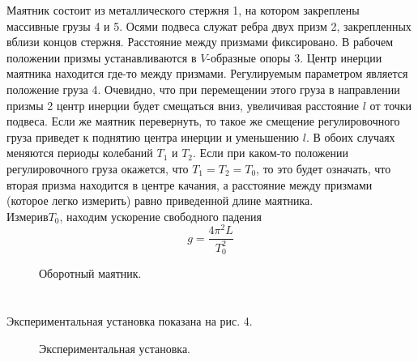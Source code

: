 \documentclass[a4paper]{article}
\begin{document}
Маятник состоит из металлического стержня 1, на котором
закреплены массивные грузы 4 и 5. Осями подвеса служат ребра двух призм 2, закрепленных вблизи концов стержня. Расстояние между призмами фиксировано. В рабочем положении призмы
устанавливаются в $V$-образные опоры 3. Центр инерции маятника находится где-то между призмами.
Регулируемым параметром является положение груза 4. Очевидно, что при перемещении этого груза в направлении призмы 2
центр инерции будет смещаться вниз, увеличивая расстояние $l$ от
точки подвеса. Если же маятник перевернуть, то такое же смещение регулировочного груза приведет к поднятию центра инерции
и уменьшению $l$. В обоих случаях меняются периоды колебаний
$T_1$ и $T_2$.
Если при каком-то положении регулировочного груза окажется, что $T_1=T_2=T_0$, то это будет означать, что вторая призма
находится в центре качания, а расстояние между призмами (которое легко измерить) равно приведенной длине маятника.\\
Измерив$T_0$, находим ускорение свободного падения
\[
g=\dfrac{4\pi^2L}{T_0^2}
\]
\begin{figure}[H]
\caption{Оборотный маятник.}
\end{figure}
\section{}
Экспериментальная установка показана на рис. 4.
\begin{figure}[H]
\caption{Экспериментальная установка.}
\end{figure}
\end{document}
